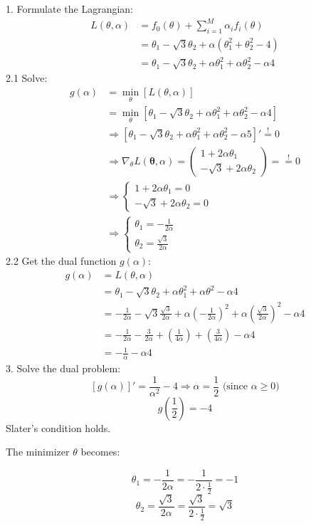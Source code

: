\begin{flushleft}
1. Formulate the Lagrangian:
\begin{align*}
  L(\theta, \alpha) &= f_0(\theta) + \sum^M_{i=1} \alpha_i f_i(\theta) \\
  &= \theta_1 - \sqrt{3} \theta_2 + \alpha(\theta_1^2  + \theta_2^2 - 4) \\
  &= \theta_1 - \sqrt{3} \theta_2 + \alpha\theta_1^2 + \alpha\theta_2^2 - \alpha 4
\end{align*}
2.1 Solve:
\begin{align*}
  g(\alpha) &= \underset{\theta}{\min}\left[ L(\theta, \alpha)\right] \\
  &= \underset{\theta}{\min}\left[\theta_1 - \sqrt{3} \theta_2 + \alpha \theta_1^2 + \alpha \theta_2^2 - \alpha 4 \right] \\
  &\Rightarrow \left[ \theta_1 - \sqrt{3} \theta_2 + \alpha \theta_1^2 + \alpha \theta_2^2 - \alpha 5 \right]' \overset{!}{=} 0 \\
  &\Rightarrow \nabla_\theta L(\mathbf{\theta}, \alpha) =
  \begin{pmatrix}
    1 + 2 \alpha \theta_1 \\
    - \sqrt{3} + 2 \alpha \theta_2
  \end{pmatrix} = \overset{!}{=} 0 \\
  &\Rightarrow \begin{cases}
    1 + 2 \alpha \theta_1 = 0 \\
    -\sqrt{3} + 2 \alpha \theta_2 = 0
  \end{cases} \\
  &\Rightarrow \begin{cases}
    \theta_1 = -\frac{1}{2\alpha} \\
    \theta_2 = \frac{\sqrt{3}}{2 \alpha}
  \end{cases}
\end{align*}
2.2 Get the dual function $g(\alpha)$:
\begin{align*}
  g(\alpha) &= L(\theta, \alpha) \\
  &= \theta_1 - \sqrt{3} \theta_2 + \alpha \theta_1^2 + \alpha \theta^2 - \alpha 4 \\
  &= -\frac{1}{2 \alpha} - \sqrt{3} \frac{\sqrt{3}}{2 \alpha} + \alpha \left( -\frac{1}{2 \alpha} \right)^2 + \alpha \left( \frac{\sqrt{3}}{2 \alpha} \right)^2 - \alpha 4 \\
  &= -\frac{1}{2 \alpha} - \frac{3}{2 \alpha} + \left(\frac{1}{4 \alpha} \right) + \left(\frac{3}{4 \alpha} \right) - \alpha 4 \\
  &= - \frac{1}{\alpha} - \alpha 4 
\end{align*}
3. Solve the dual problem:
\[ 
\left[g(\alpha)\right]' = \frac{1}{\alpha^2} - 4 \Rightarrow \alpha = \frac{1}{2} \text{ (since $\alpha \geq 0$)}
\]
\[ 
g\left(\frac{1}{2}\right) = -4
\]
Slater's condition holds.
\end{flushleft}
\begin{flushleft}
The minimizer $\theta$ becomes:
\end{flushleft}
\[ \theta_1 = -\frac{1}{2\alpha} = -\frac{1}{2\cdot\frac{1}{2}} = -1 \]
\[ \theta_2 = \frac{\sqrt{3}}{2 \alpha} = \frac{\sqrt{3}}{2 \cdot \frac{1}{2}} = \sqrt{3} \]
%
%
%

